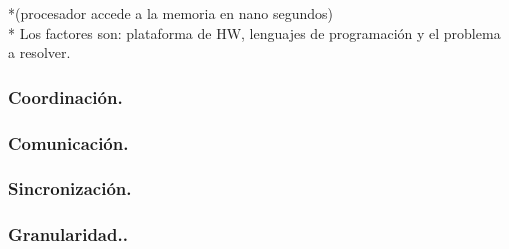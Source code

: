 \documentclass[12pt]{article}
\begin{document}
*(procesador accede a la memoria en nano segundos)\\
* Los factores son: plataforma de HW, lenguajes de programación y el problema a resolver.
\vspace{2em}

{\color{blue} \subsubsection*{\textbf{Coordinación.}}}
\vspace{1em}

{\color{blue} \subsubsection*{\textbf{Comunicación.}}}
\vspace{1em}

{\color{blue} \subsubsection*{\textbf{Sincronización.}}}
\vspace{1em}

{\color{blue} \subsubsection*{\textbf{Granularidad..}}}
\vspace{1em}
\end{document}
